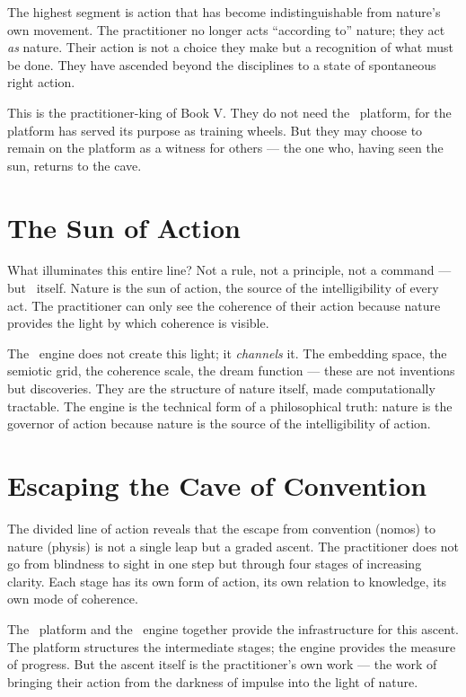 The highest segment is action that has become indistinguishable from nature's
own movement. The practitioner no longer acts ``according to'' nature; they act
\textit{as} nature. Their action is not a choice they make but a recognition of
what must be done. They have ascended beyond the disciplines to a state of
spontaneous right action.

This is the practitioner-king of Book V. They do not need the \praxis\ platform,
for the platform has served its purpose as training wheels. But they may choose
to remain on the platform as a witness for others --- the one who, having seen
the sun, returns to the cave.

\section{The Sun of Action}

What illuminates this entire line? Not a rule, not a principle, not a command
--- but \physis\ itself. Nature is the sun of action, the source of the
intelligibility of every act. The practitioner can only see the coherence of
their action because nature provides the light by which coherence is visible.

The \physis\ engine does not create this light; it \emph{channels} it. The
embedding space, the semiotic grid, the coherence scale, the dream function ---
these are not inventions but discoveries. They are the structure of nature
itself, made computationally tractable. The engine is the technical form of a
philosophical truth: nature is the governor of action because nature is the
source of the intelligibility of action.

\section{Escaping the Cave of Convention}

The divided line of action reveals that the escape from convention (nomos) to
nature (physis) is not a single leap but a graded ascent. The practitioner does
not go from blindness to sight in one step but through four stages of increasing
clarity. Each stage has its own form of action, its own relation to knowledge,
its own mode of coherence.

The \praxis\ platform and the \physis\ engine together provide the infrastructure
for this ascent. The platform structures the intermediate stages; the engine
provides the measure of progress. But the ascent itself is the practitioner's
own work --- the work of bringing their action from the darkness of impulse
into the light of nature.
